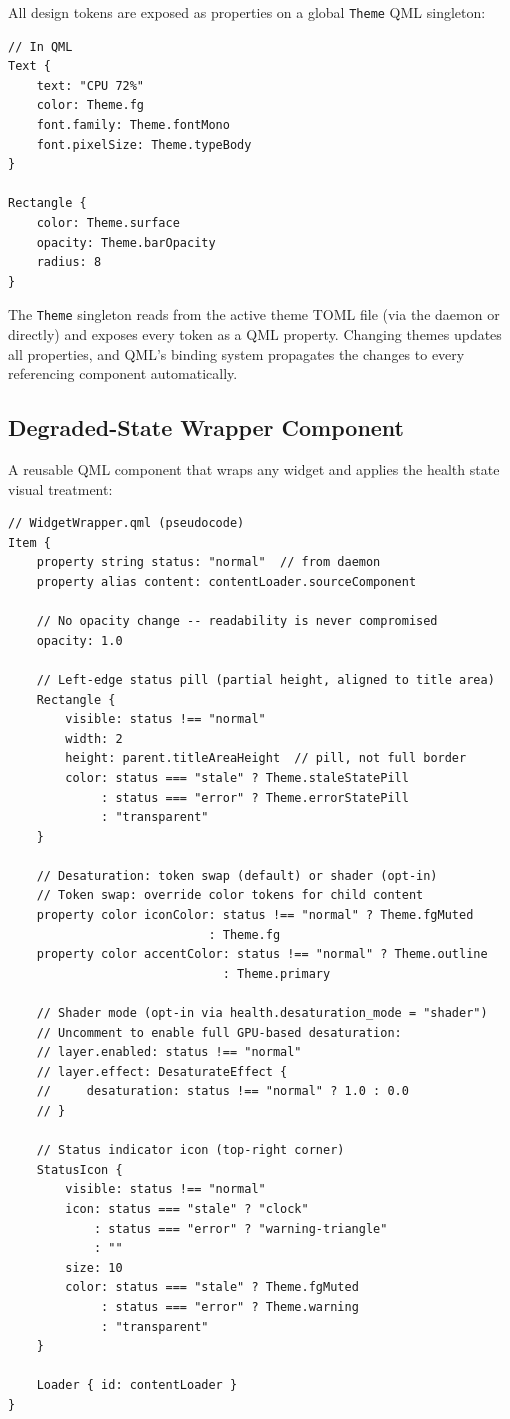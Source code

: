 \documentclass[11pt,a4paper]{article}
\begin{document}
All design tokens are exposed as properties on a global \texttt{Theme} QML singleton:

\begin{lstlisting}[language={}]
// In QML
Text {
    text: "CPU 72%"
    color: Theme.fg
    font.family: Theme.fontMono
    font.pixelSize: Theme.typeBody
}

Rectangle {
    color: Theme.surface
    opacity: Theme.barOpacity
    radius: 8
}
\end{lstlisting}

The \texttt{Theme} singleton reads from the active theme TOML file (via the daemon or directly) and exposes every token as a QML property. Changing themes updates all properties, and QML's binding system propagates the changes to every referencing component automatically.

\subsection{Degraded-State Wrapper Component}

A reusable QML component that wraps any widget and applies the health state visual treatment:

\begin{lstlisting}[language={}]
// WidgetWrapper.qml (pseudocode)
Item {
    property string status: "normal"  // from daemon
    property alias content: contentLoader.sourceComponent

    // No opacity change -- readability is never compromised
    opacity: 1.0

    // Left-edge status pill (partial height, aligned to title area)
    Rectangle {
        visible: status !== "normal"
        width: 2
        height: parent.titleAreaHeight  // pill, not full border
        color: status === "stale" ? Theme.staleStatePill
             : status === "error" ? Theme.errorStatePill
             : "transparent"
    }

    // Desaturation: token swap (default) or shader (opt-in)
    // Token swap: override color tokens for child content
    property color iconColor: status !== "normal" ? Theme.fgMuted
                            : Theme.fg
    property color accentColor: status !== "normal" ? Theme.outline
                              : Theme.primary

    // Shader mode (opt-in via health.desaturation_mode = "shader")
    // Uncomment to enable full GPU-based desaturation:
    // layer.enabled: status !== "normal"
    // layer.effect: DesaturateEffect {
    //     desaturation: status !== "normal" ? 1.0 : 0.0
    // }

    // Status indicator icon (top-right corner)
    StatusIcon {
        visible: status !== "normal"
        icon: status === "stale" ? "clock"
            : status === "error" ? "warning-triangle"
            : ""
        size: 10
        color: status === "stale" ? Theme.fgMuted
             : status === "error" ? Theme.warning
             : "transparent"
    }

    Loader { id: contentLoader }
}
\end{lstlisting}
\end{document}
